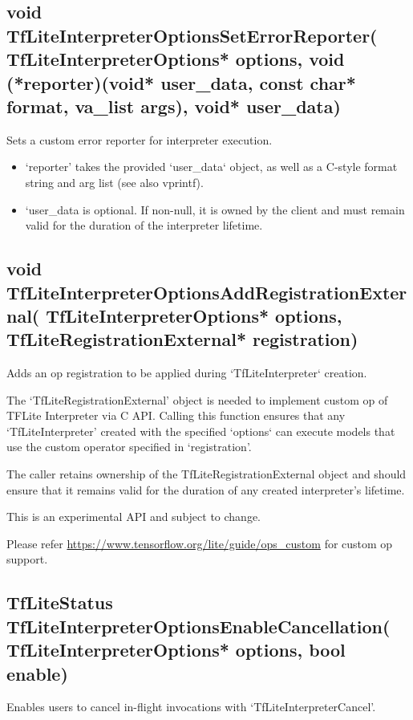 \documentclass{ol-softwaremanual}
\begin{document}
\subsection{void TfLiteInterpreterOptionsSetErrorReporter(
    TfLiteInterpreterOptions* options,
    void (*reporter)(void* user\_data, const char* format, va\_list args),
    void* user\_data)}

Sets a custom error reporter for interpreter execution.

\begin{itemize}
    \item `reporter' takes the provided `user\_data` object, as well as a C-style format string and arg list (see also vprintf).
    \item `user\_data is optional. If non-null, it is owned by the client and must remain valid for the duration of the interpreter lifetime.
\end{itemize}

\subsection{void TfLiteInterpreterOptionsAddRegistrationExternal(
    TfLiteInterpreterOptions* options,
    TfLiteRegistrationExternal* registration)}

Adds an op registration to be applied during `TfLiteInterpreter` creation.

 The `TfLiteRegistrationExternal' object is needed to implement custom op of TFLite Interpreter via C API. Calling this function ensures that any `TfLiteInterpreter' created with the specified `options` can execute models that use the custom operator specified in `registration'.
 
 The caller retains ownership of the TfLiteRegistrationExternal object and should ensure that it remains valid for the duration of any created interpreter's lifetime.
 
 This is an experimental API and subject to change.

 Please refer \url{https://www.tensorflow.org/lite/guide/ops\_custom} for custom op support.

\subsection{TfLiteStatus TfLiteInterpreterOptionsEnableCancellation(
    TfLiteInterpreterOptions* options, bool enable)}

Enables users to cancel in-flight invocations with `TfLiteInterpreterCancel'.
\end{document}
